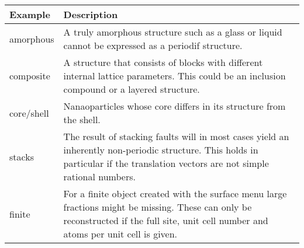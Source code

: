 \begin{tabularx}{\textwidth}{|p{30mm}|X|}
  \hline
  {\bf Example} & {\bf Description} \\
  \hline\hline
  amorphous    & A truly amorphous structure such as a glass or liquid 
                 cannot be expressed as a periodif structure. \\
  composite    & A structure that consists of blocks with different 
                 internal lattice parameters. This could be an inclusion
                 compound or a layered structure.\\
  core/shell   & Nanaoparticles whose core differs in its structure
                 from the shell.\\
  stacks       & The result of stacking faults will in most cases yield
                 an inherently non-periodic structure. This holds in 
                 particular if the translation vectors are not simple
                 rational numbers. \\
  finite       & For a finite object created with the surface menu large
                 fractions might be missing. These can only be reconstructed
                 if the full site, unit cell number and atoms per unit 
                 cell is given.\\
  \hline
\end{tabularx}
